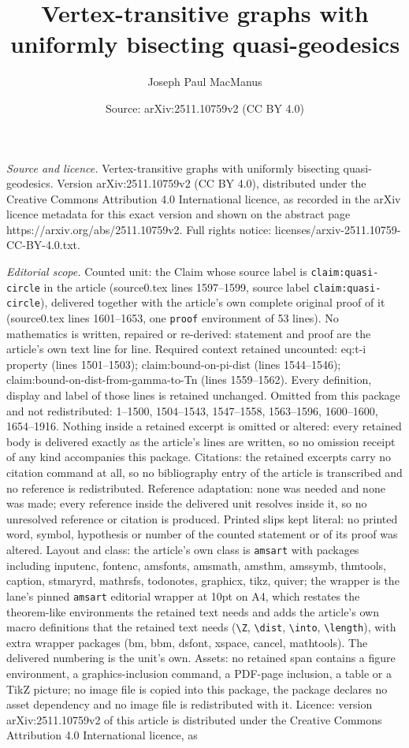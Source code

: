 \documentclass[10pt,a4paper]{amsart}
\title[Vertex-transitive graphs with uniformly bisecting quasi-geod]{Vertex-transitive graphs with uniformly bisecting quasi-geodesics}
\author{Joseph Paul MacManus}
\date{Source: arXiv:2511.10759v2 (CC BY 4.0)}
\begin{document}
\maketitle

\noindent\emph{Source and licence.} Vertex-transitive graphs with uniformly bisecting quasi-geodesics. Version arXiv:2511.10759v2 (CC BY 4.0), distributed under the Creative Commons Attribution 4.0 International licence, as recorded in the arXiv licence metadata for this exact version and shown on the abstract page https://arxiv.org/abs/2511.10759v2. Full rights notice: licenses/arxiv-2511.10759-CC-BY-4.0.txt.\par\smallskip

\noindent\textit{Editorial scope.} Counted unit: the Claim whose source label is \texttt{claim:quasi-circle} in the article (source0.tex lines 1597--1599, source label \texttt{claim:quasi-circle}), delivered together with the article's own complete original proof of it (source0.tex lines 1601--1653, one \texttt{proof} environment of 53 lines). No mathematics is written, repaired or re-derived: statement and proof are the article's own text line for line. Required context retained uncounted: eq:t-i property (lines 1501--1503); claim:bound-on-pi-dist (lines 1544--1546); claim:bound-on-dist-from-gamma-to-Tn (lines 1559--1562). Every definition, display and label of those lines is retained unchanged. Omitted from this package and not redistributed: 1--1500, 1504--1543, 1547--1558, 1563--1596, 1600--1600, 1654--1916. Nothing inside a retained excerpt is omitted or altered: every retained body is delivered exactly as the article's lines are written, so no omission receipt of any kind accompanies this package. Citations: the retained excerpts carry no citation command at all, so no bibliography entry of the article is transcribed and no reference is redistributed. Reference adaptation: none was needed and none was made; every reference inside the delivered unit resolves inside it, so no unresolved reference or citation is produced. Printed slips kept literal: no printed word, symbol, hypothesis or number of the counted statement or of its proof was altered. Layout and class: the article's own class is \texttt{amsart} with packages including inputenc, fontenc, amsfonts, amsmath, amsthm, amssymb, thmtools, caption, stmaryrd, mathrsfs, todonotes, graphicx, tikz, quiver; the wrapper is the lane's pinned \texttt{amsart} editorial wrapper at 10pt on A4, which restates the theorem-like environments the retained text needs and adds the article's own macro definitions that the retained text needs (\texttt{\textbackslash Z}, \texttt{\textbackslash dist}, \texttt{\textbackslash into}, \texttt{\textbackslash length}), with extra wrapper packages (bm, bbm, dsfont, xspace, cancel, mathtools). The delivered numbering is the unit's own. Assets: no retained span contains a figure environment, a graphics-inclusion command, a PDF-page inclusion, a table or a TikZ picture; no image file is copied into this package, the package declares no asset dependency and no image file is redistributed with it. Licence: version arXiv:2511.10759v2 of this article is distributed under the Creative Commons Attribution 4.0 International licence, as 
\end{document}
